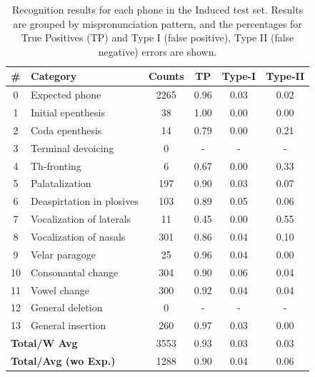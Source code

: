 \documentclass[twocolumn]{bmcart}%
\begin{document}
\small
\begin{table}[ht!]
\caption{Recognition results for each phone in the Induced test set. Results are grouped by mispronunciation pattern, and the percentages for True Positives (TP) and Type I (false positive), Type II (false negative) errors are shown.}
\setlength{\tabcolsep}{0.3em}
\begin{tabular}{clcccc} \hline
\textbf{\#} & \textbf{Category} & \textbf{Counts} & \textbf{TP} & \textbf{Type-I} & \textbf{Type-II} \\ \hline
0 & Expected phone & 2265 & 0.96 & 0.03 & 0.02 \\
1 & Initial epenthesis & 38 & 1.00 & 0.00 & 0.00 \\
2 & Coda epenthesis & 14 & 0.79 & 0.00 & 0.21 \\
3 & Terminal devoicing & 0 & - & - & - \\
4 & Th-fronting & 6 & 0.67 & 0.00 & 0.33 \\
5 & Palatalization & 197 & 0.90 & 0.03 & 0.07 \\
6 & Deaspirtation in plosives & 103 & 0.89 & 0.05 & 0.06 \\
7 & Vocalization of laterals & 11 & 0.45 & 0.00 & 0.55 \\
8 & Vocalization of nasals & 301 & 0.86 & 0.04 & 0.10 \\
9 & Velar paragoge & 25 & 0.96 & 0.04 & 0.00 \\
10 & Consonantal change & 304 & 0.90 & 0.06 & 0.04 \\
11 & Vowel change & 300 & 0.92 & 0.04 & 0.04 \\
12 & General deletion & 0 & - & - & - \\
13 & General insertion & 260 & 0.97 & 0.03 & 0.00 \\ \hline
\multicolumn{2}{l}{\textbf{Total/W Avg}} & 3553 & 0.93 & 0.03 & 0.03 \\ 
\multicolumn{2}{l}{\textbf{Total/Avg (wo Exp.)}} & 1288 & 0.90 & 0.04 & 0.06 \\  \hline
\end{tabular}
\label{rec-induced}
\end{table}
\normalsize
\end{document}
